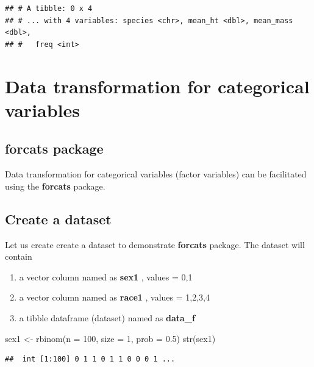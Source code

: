 \documentclass[
]{book}
\makeatletter
\newenvironment{Shaded}{\begin{snugshade}}{\end{snugshade}}
\newcommand{\AttributeTok}[1]{\textcolor[rgb]{0.61,0.61,0.61}{#1}}
\newcommand{\DecValTok}[1]{\textcolor[rgb]{0.06,0.06,0.06}{#1}}
\newcommand{\FloatTok}[1]{\textcolor[rgb]{0.06,0.06,0.06}{#1}}
\newcommand{\FunctionTok}[1]{\textcolor[rgb]{0,0,0}{#1}}
\newcommand{\NormalTok}[1]{#1}
\newcommand{\OtherTok}[1]{\textcolor[rgb]{0.37,0.37,0.37}{#1}}
\providecommand{\tightlist}{%
  \setlength{\itemsep}{0pt}\setlength{\parskip}{0pt}}
\newenvironment{kframe}{%
\medskip{}
\setlength{\fboxsep}{.8em}
 \def\at@end@of@kframe{}%
 \ifinner\ifhmode%
  \def\at@end@of@kframe{\end{minipage}}%
  \begin{minipage}{\columnwidth}%
 \fi\fi%
 \def\FrameCommand##1{\hskip\@totalleftmargin \hskip-\fboxsep
 \colorbox{shadecolor}{##1}\hskip-\fboxsep
     \hskip-\linewidth \hskip-\@totalleftmargin \hskip\columnwidth}%
 \MakeFramed {\advance\hsize-\width
   \@totalleftmargin\z@ \linewidth\hsize
   \@setminipage}}%
 {\par\unskip\endMakeFramed%
 \at@end@of@kframe}
\renewenvironment{Shaded}{\begin{kframe}}{\end{kframe}}
\makeatother
\begin{document}
\begin{verbatim}
## # A tibble: 0 x 4
## # ... with 4 variables: species <chr>, mean_ht <dbl>, mean_mass <dbl>,
## #   freq <int>
\end{verbatim}

\hypertarget{data-transformation-for-categorical-variables}{%
\section{Data transformation for categorical variables}\label{data-transformation-for-categorical-variables}}

\hypertarget{forcats-package}{%
\subsection{\texorpdfstring{\textbf{forcats} package}{forcats package}}\label{forcats-package}}

Data transformation for categorical variables (factor variables) can be facilitated using the \textbf{forcats} package.

\hypertarget{create-a-dataset}{%
\subsection{Create a dataset}\label{create-a-dataset}}

Let us create create a dataset to demonstrate \textbf{forcats} package. The dataset will contain

\begin{enumerate}
\def\labelenumi{\arabic{enumi}.}
\tightlist
\item
  a vector column named as \textbf{sex1} , values = 0,1
\item
  a vector column named as \textbf{race1} , values = 1,2,3,4
\item
  a tibble dataframe (dataset) named as \textbf{data\_f}
\end{enumerate}

\begin{Shaded}
\begin{Highlighting}[]
\NormalTok{sex1 }\OtherTok{\textless{}{-}} \FunctionTok{rbinom}\NormalTok{(}\AttributeTok{n =} \DecValTok{100}\NormalTok{, }\AttributeTok{size =} \DecValTok{1}\NormalTok{, }\AttributeTok{prob =} \FloatTok{0.5}\NormalTok{) }
\FunctionTok{str}\NormalTok{(sex1)}
\end{Highlighting}
\end{Shaded}

\begin{verbatim}
##  int [1:100] 0 1 1 0 1 1 0 0 0 1 ...
\end{verbatim}
\end{document}

